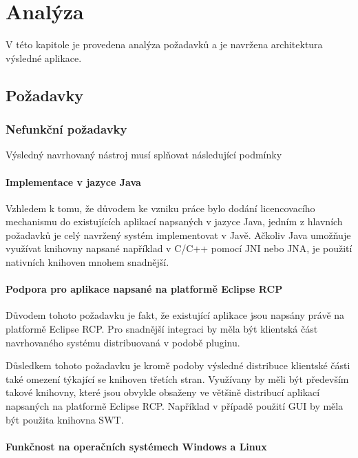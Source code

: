 \chapter{Analýza}

V této kapitole je provedena analýza požadavků a je navržena architektura
výsledné aplikace.



\section{Požadavky}

\subsection{Nefunkční požadavky}

Výsledný navrhovaný nástroj musí splňovat následující podmínky

\subsubsection*{Implementace v jazyce Java}

Vzhledem k tomu, že důvodem ke vzniku práce bylo dodání licencovacího mechanismu
do existujících aplikací napsaných v jazyce Java, jedním z hlavních požadavků
je celý navržený systém implementovat v Javě. Ačkoliv Java umožňuje využívat
knihovny napsané například v C/C++ pomocí JNI\cite{jni} nebo JNA\cite{jna}, je
použití nativních knihoven mnohem snadnější.


\subsubsection*{Podpora pro aplikace napsané na platformě Eclipse RCP}

Důvodem tohoto požadavku je fakt, že existující aplikace jsou napsány právě na
platformě Eclipse RCP\cite{eclipse-rcp}. Pro snadnější integraci by měla být
klientská část navrhovaného systému distribuovaná v podobě pluginu.

Důsledkem tohoto požadavku je kromě podoby výsledné distribuce klientské části
také omezení týkající se knihoven třetích stran. Využívany by měli být především
takové knihovny, které jsou obvykle obsaženy ve většině distribucí aplikací
napsaných na platformě Eclipse RCP. Například v případě použití GUI by měla být
použita knihovna SWT\cite{swt}.

\subsubsection*{Funkčnost na operačních systémech Windows a Linux}

